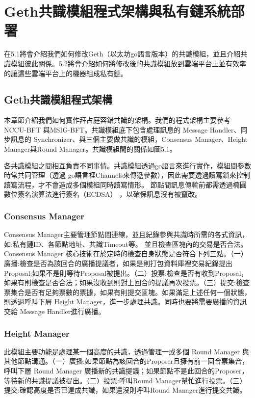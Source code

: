 \chapter{Geth共識模組程式架構與私有鏈系統部署}\label{se_5}
在5.1將會介紹我們如何修改Geth（以太坊go語言版本）的共識模組，並且介紹共識模組彼此關係。5.2將會介紹如何將修改後的共識模組放到雲端平台上並有效率的讓這些雲端平台上的機器組成私有鏈。
\section{Geth共識模組程式架構}\label{se_5}
本章節介紹我們如何實作拜占庭容錯共識的架構。我們的程式架構主要參考NCCU-BFT \cite{nccubft}與MSIG-BFT。共識模組底下包含處理訊息的 Message Handler、同步訊息的 Synchronizer、與三個主要做共識的模組，Consensus Manager、Height Manager與Round Manager。共識模組間的關係如圖5.1。

各共識模組之間相互負責不同事情。共識模組透過go語言來進行實作，模組間參數時常共同管理（透過 go語言裡Channels來傳遞參數），因此需要透過讀寫鎖來控制讀寫流程，才不會造成多個模組同時讀寫情形。
節點間訊息傳輸前都需透過橢圓數位簽名演算法進行簽名（ECDSA） \cite{ecdsa}，以確保訊息沒有被竄改。  





\subsection{Consensus Manager}\label{se_5} 
Consensus Manager主要管理節點間連線，並且紀錄參與共識時所需的各式資訊，如:私有鏈ID、各節點地址、共識Timeout等。
並且檢查區塊內的交易是否合法。Consensus Manager 核心技術在於定時的檢查自身狀態是否符合下列三點。（一）廣播:檢查是否為該回合的廣播提議者，如果是則打包資料庫裡交易紀錄提出Proposal;如果不是則等待Proposal被提出。（二）投票:檢查是否有收到Proposal，如果有則檢查是否合法；如果沒收到則對上回合的提議再次投票。（三）提交:檢查票集合是否有足夠票數的票據，如果有則提交區塊。如果滿足上述任何一個狀態，則透過呼叫下層 Height Manager，進一步處理共識。同時也要將需要廣播的資訊交給 Message Handler進行廣播。
\subsection{Height Manager}\label{se_5}
此模組主要功能是處理某一個高度的共識，透過管理一或多個 Round Manager 與其他節點溝通。（一）廣播:如果節點為該回合的Proposer且擁有前一回合票集合，呼叫下層 Round Manager 廣播新的共識提議；如果節點不是此回合的Proposer，等待新的共識提議被提出。（二）投票:呼叫Round Manager幫忙進行投票。（三）提交:確認高度是否已達成共識，如果還沒則呼叫Round Manager進行提交共識。


